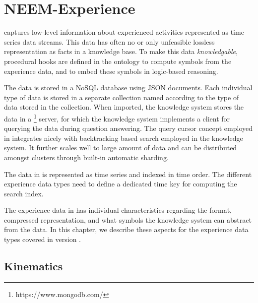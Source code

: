 \chapter{NEEM-Experience}
\label{ch:experience}

\neemexp captures low-level information about experienced activities
represented as time series data streams.
This data has often no or only unfeasible
lossless representation as facts in a knowledge base.
To make this data \emph{knowledgable}, procedural hooks
are defined in the ontology to compute symbols from the experience data,
and to embed these symbols in logic-based reasoning.

The data is stored in a NoSQL database using JSON documents.
Each individual type of data is stored in a separate collection
named according to the type of data stored in the collection.
When imported, the knowledge system stores the data in a
\mongodb\footnote{https://www.mongodb.com/} server, for which
the knowledge system implements a client for querying the data
during question answering.
The query cursor concept employed in \mongodb integrates
nicely with backtracking based search employed in the knowledge system.
It further scales well to large amount of data and can be distributed amongst
clusters through built-in automatic sharding.

The data in \neemexps is represented as time series
and indexed in time order.
The different experience data types need to define a dedicated
time key for computing the search index.


The experience data in \neems has individual characteristics regarding
the format, compressed representation, and what symbols the 
knowledge system can abstract from the data.
In this chapter, we describe these aspects for the experience data types covered 
in \neem version \neemversion.

\section{Kinematics}
